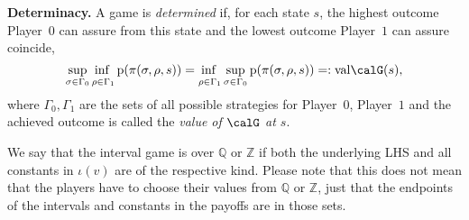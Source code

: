 \documentclass[fleqn,envcountsame]{LMCS}
\newcommand{\val}{\ensuremath{\mathrm{val}}}
\newcommand{\pzero}{Player~$0$\xspace}
\newcommand{\pone}{Player~$1$\xspace}
\newcommand{\setQ}{\ensuremath{\mathbb{Q}}}
\newcommand{\setZ}{\ensuremath{\mathbb{Z}}}
\begin{document}
\textbf{Determinacy.} 
A game is \emph{determined} if, for each state $s$, the highest outcome
\pzero can assure from this state and the lowest outcome \pone can assure
coincide,
\[ \adjustlimits\sup_{\sigma \in \Gamma_0} \inf_{\rho \in \Gamma_1}
      \pay(\pi(\sigma, \rho,s)) = 
  \adjustlimits\inf_{\rho \in \Gamma_1} \sup_{\sigma \in \Gamma_0}
      \pay(\pi(\sigma, \rho,s)) =: \val \calG (s),\]
where $\Gamma_0, \Gamma_1$ are the sets of all possible strategies 
for \pzero, \pone and the achieved outcome is called the 
\emph{value of $\calG$ at $s$}.

We say that the interval game is over $\setQ$ or $\setZ$ if both
the underlying LHS and all constants in $\iota(v)$
are of the respective kind. Please note that this does
not mean that the players have to choose their values from $\setQ$ or
$\setZ$, just that the endpoints of the intervals and constants
in the payoffs are in those sets.
\end{document}
